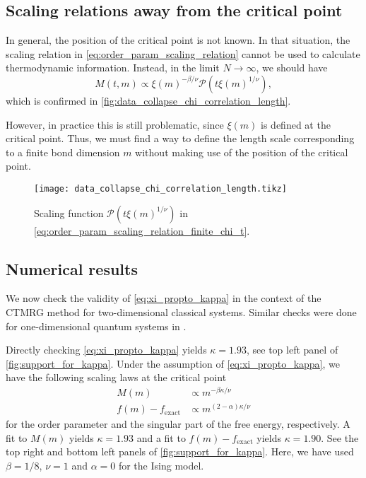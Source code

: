 \subsection{Scaling relations away from the critical point}
In general, the position of the critical point is not known. In that situation, the scaling relation in
\autoref{eq:order_param_scaling_relation} cannot be used to calculate thermodynamic information. Instead, in the limit
$N \to \infty$, we should have
\begin{equation}\label{eq:order_param_scaling_relation_finite_chi_t}
  M(t, m) \propto \xi(m)^{-\beta/\nu}\mathcal{P}(t \xi(m)^{1/\nu}),
\end{equation}
which is confirmed in \autoref{fig:data_collapse_chi_correlation_length}.

However, in practice this is still problematic, since $\xi(m)$ is defined at the critical point. Thus, we must find a
way to define the length scale corresponding to a finite bond dimension $m$ without making use of the position of the
critical point.

\begin{figure}
  \texttt{[image: data\_collapse\_chi\_correlation\_length.tikz]}
  \caption{Scaling function $\mathcal{P}(t \xi(m)^{1/\nu})$ in
  \autoref{eq:order_param_scaling_relation_finite_chi_t}.}\label{fig:data_collapse_chi_correlation_length}
\end{figure}


\subsection{Numerical results}

We now check the validity of \autoref{eq:xi_propto_kappa} in the context of the CTMRG method for two-dimensional
classical systems. Similar checks were done for one-dimensional quantum systems in \cite{tagliacozzo2008scaling}.

Directly checking \autoref{eq:xi_propto_kappa} yields $\kappa = 1.93$, see top left panel of
\autoref{fig:support_for_kappa}.
Under the assumption of \autoref{eq:xi_propto_kappa}, we have the following scaling laws at the critical point
\begin{align}\label{eq:scaling_laws_order_param_free_energy_kappa}
  M(m) & \propto m^{-\beta \kappa / \nu} \\
  f(m) - f_{\text{exact}} & \propto m^{(2-\alpha)\kappa / \nu}
\end{align}
for the order parameter and the singular part of the free energy, respectively. A fit to $M(m)$ yields $\kappa = 1.93$
and a fit to $f(m) - f_{\text{exact}}$ yields $\kappa = 1.90$. See the top right and bottom left panels of
\autoref{fig:support_for_kappa}. Here, we have used $\beta = 1/8$, $\nu = 1$ and $\alpha = 0$ for the Ising model.

